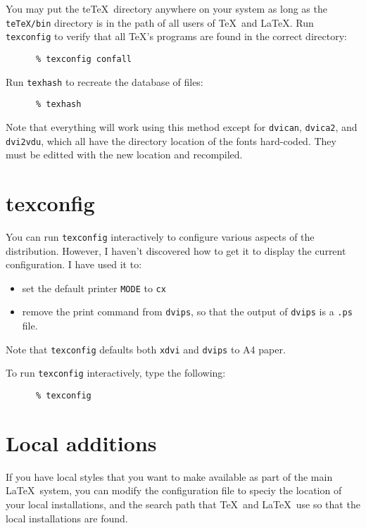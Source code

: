 \documentclass[11pt,twoside]{article}
\newcommand{\xlabel}[1]{}
\begin{document}
You may put the te\TeX\ directory anywhere on your system as long as
the \texttt{teTeX/bin} directory is in the path of all users of
\TeX\ and \LaTeX.  Run \texttt{texconfig} to verify that all \TeX's
programs are found in the correct directory:

\begin{verbatim}
      % texconfig confall
\end{verbatim}

Run \texttt{texhash} to recreate the database of files:

\begin{verbatim}
      % texhash
\end{verbatim}

Note that everything will work using this method except for
\texttt{dvican}, \texttt{dvica2}, and \texttt{dvi2vdu}, which all have
the directory location of the fonts hard-coded. They must be editted
with the new location and recompiled.

\section{texconfig\xlabel{texconfig}}

You can run \texttt{texconfig} interactively to configure various
aspects of the distribution. However, I haven't discovered how to get
it to display the current configuration. I have used it to:

\begin{itemize}
  \item set the default printer \texttt{MODE} to \texttt{cx}
  \item remove the print command from \texttt{dvips}, so that the output of
        \texttt{dvips} is a \texttt{.ps} file.
\end{itemize}

Note that \texttt{texconfig} defaults both \texttt{xdvi} and \texttt{dvips}
to A4 paper.

To run \texttt{texconfig} interactively, type the following:

\begin{verbatim}
      % texconfig
\end{verbatim}

\section{\xlabel{local-config}Local additions}

If you have local styles that you want to make available as part of the
main \LaTeX\ system, you can modify the configuration file to speciy the
location of your local installations, and the search path that \TeX\ and
\LaTeX\ use so that the local installations are found.
\end{document}
